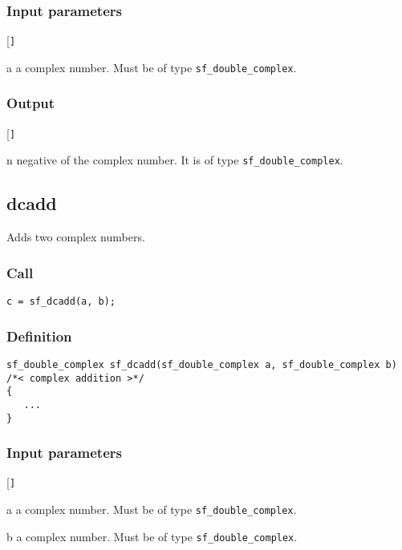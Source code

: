 \subsubsection*{Input parameters}
\begin{desclist}{\tt }{\quad}[\tt ]
   \setlength\itemsep{0pt}
   \item[a] a complex number. Must be of type \texttt{sf\_double\_complex}.  
\end{desclist}

\subsubsection*{Output}
\begin{desclist}{\tt }{\quad}[\tt ]
   \setlength\itemsep{0pt}
   \item[n] negative of the complex number. It is of type \texttt{sf\_double\_complex}.
\end{desclist}




\subsection{{dcadd}}
Adds two complex numbers.

\subsubsection*{Call}
\begin{verbatim}c = sf_dcadd(a, b);\end{verbatim}

\subsubsection*{Definition}
\begin{verbatim}
sf_double_complex sf_dcadd(sf_double_complex a, sf_double_complex b)
/*< complex addition >*/
{
   ...
}
\end{verbatim}

\subsubsection*{Input parameters}
\begin{desclist}{\tt }{\quad}[\tt ]
   \setlength\itemsep{0pt}
   \item[a] a complex number. Must be of type \texttt{sf\_double\_complex}. 
   \item[b] a complex number. Must be of type \texttt{sf\_double\_complex}.  
\end{desclist}

